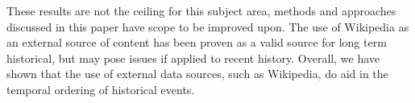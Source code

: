 \documentclass[bsc,frontabs,twoside,singlespacing,parskip,deptreport]{infthesis}     %
\begin{document}
These results are not the ceiling for this subject area, methods and approaches discussed in this paper have scope
to be improved upon. The use of Wikipedia as an external source of content has been proven as a valid source for
long term historical, but may pose issues if applied to recent history. Overall, we have shown that the use of external
data sources, such as Wikipedia, do aid in the temporal ordering of historical events.


\end{document}
